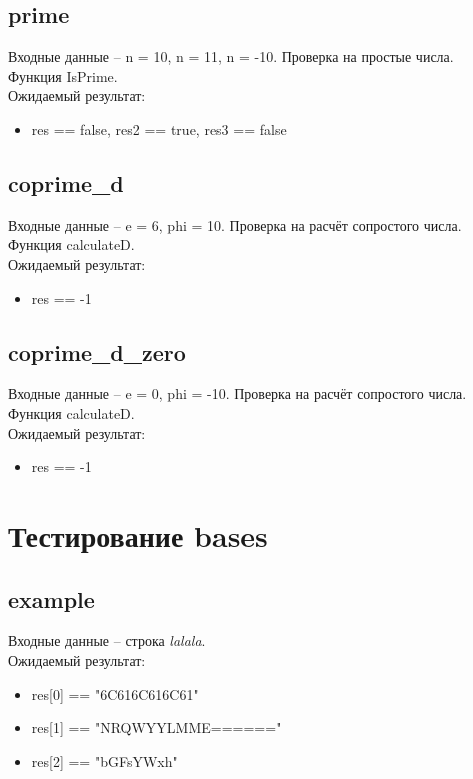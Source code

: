 \documentclass{article}
\begin{document}
\subsection{prime}
Входные данные -- n = 10, n = 11, n = -10. Проверка на простые числа. Функция IsPrime.\\
Ожидаемый результат: 
\begin{itemize}
    \item res == false, res2 == true, res3 == false 
\end{itemize}

\subsection{coprime\_d}
Входные данные -- e = 6, phi = 10. Проверка на расчёт сопростого числа. Функция calculateD.\\
Ожидаемый результат: 
\begin{itemize}
    \item res == -1 
\end{itemize}

\subsection{coprime\_d\_zero}
Входные данные -- e = 0, phi = -10. Проверка на расчёт сопростого числа. Функция calculateD.\\
Ожидаемый результат: 
\begin{itemize}
    \item res == -1 
\end{itemize}

\section{Тестирование bases}
\subsection{example}
Входные данные -- строка \textit{lalala}.\\
Ожидаемый результат: 
\begin{itemize}
    \item res[0] == "6C616C616C61"
    \item res[1] == "NRQWYYLMME======"
    \item res[2] == "bGFsYWxh" 
\end{itemize}
\end{document}
